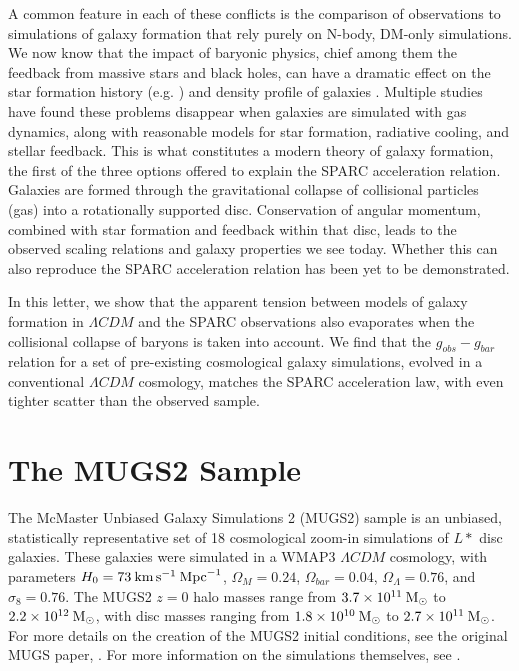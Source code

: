 A common feature in each of these conflicts is the comparison of observations to
simulations of galaxy formation that rely purely on N-body, DM-only simulations.
We now know that the impact of baryonic physics, chief among them the feedback
from massive stars and black holes, can have a dramatic effect on the star
formation history (e.g. \citealt{Keller2015}) and density profile of galaxies
\citep{Mashchenko2006}.  Multiple studies \citep[etc]{Pontzen2012,Sawala2016}
have found these problems disappear when galaxies are simulated with gas
dynamics, along with reasonable models for star formation, radiative cooling,
and stellar feedback.  This is what constitutes a modern theory of galaxy
formation, the first of the three options offered to explain the SPARC
acceleration relation.  Galaxies are formed through the gravitational collapse
of collisional particles (gas) into a rotationally supported disc.  Conservation
of angular momentum, combined with star formation and feedback within that disc,
leads to the observed scaling relations and galaxy properties we see today.
Whether this can also reproduce the SPARC acceleration relation has been yet to
be demonstrated.

In this letter, we show that the apparent tension between models of galaxy
formation in $\Lambda CDM$ and the SPARC observations also evaporates when the
collisional collapse of baryons is taken into account.  We find that the
$g_{obs}-g_{bar}$ relation for a set of pre-existing cosmological galaxy
simulations, evolved in a conventional $\Lambda CDM$ cosmology, matches the
SPARC acceleration law, with even tighter scatter than the observed sample.

\section{The MUGS2 Sample}
The McMaster Unbiased Galaxy Simulations 2 (MUGS2) sample is an unbiased,
statistically representative set of 18 cosmological zoom-in simulations of $L*$
disc galaxies.  These galaxies were simulated in a {\sc WMAP3} $\Lambda CDM$
cosmology, with parameters $H_0 = 73\>{\rm km}\,{\rm s}^{-1} \>{\rm Mpc}^{-1}$, $\Omega_M=0.24$,
$\Omega_{bar}=0.04$, $\Omega_\Lambda=0.76$, and $\sigma_8=0.76$.  The MUGS2
$z=0$ halo masses range from $3.7\times10^{11}\>{\rm M_{\odot}}$ to $2.2\times10^{12}\>{\rm M_{\odot}}$,
with disc masses ranging from $1.8\times10^{10}\>{\rm M_{\odot}}$ to
$2.7\times10^{11}\>{\rm M_{\odot}}$.  For more details on the creation of the MUGS2 initial
conditions, see the original MUGS paper, \citet{Stinson2010}.  For more
information on the simulations themselves, see \citet{Keller2015,Keller2016}.

